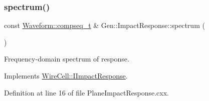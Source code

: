 \mbox{\label{class_wire_cell_1_1_gen_1_1_impact_response_a8bd5c0dbe10911359e29892d4f1380c1}} 
\subsubsection{\texorpdfstring{spectrum()}{spectrum()}}
{\footnotesize\ttfamily const \hyperlink{namespace_wire_cell_1_1_waveform_a7e4a8d371f774438bb360e7d1dcb583a}{Waveform\+::compseq\+\_\+t} \& Gen\+::\+Impact\+Response\+::spectrum (\begin{DoxyParamCaption}{ }\end{DoxyParamCaption})\hspace{0.3cm}{\ttfamily [virtual]}}



Frequency-\/domain spectrum of response. 



Implements \hyperlink{class_wire_cell_1_1_i_impact_response_ade63911c39df242ecc8b6858916b0fc8}{Wire\+Cell\+::\+I\+Impact\+Response}.



Definition at line 16 of file Plane\+Impact\+Response.\+cxx.

